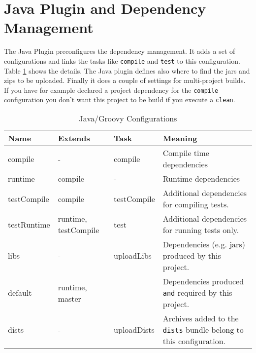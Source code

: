 \section{Java Plugin and Dependency Management} %
\label{sec:java_plugin_and_dependency_management}
The Java Plugin preconfigures the dependency management. It adds a set of configurations and links the tasks like \texttt{compile} and \texttt{test} to this configuration. Table \ref{tab:configurations} shows the details. The Java plugin defines also where to find the jars and zips to be uploaded. Finally it does a couple of settings for multi-project builds. If you have for example declared a project dependency for the \texttt{compile} configuration you don't want this project to be build if you execute a \texttt{clean}.

\begin{table}
	\begin{tabularx}{\textwidth}{|l|l|l|X|} \hline
	\textbf{Name} & \textbf{Extends} & \textbf{Task} & \textbf{Meaning} \\ \hline
	compile & - & compile & Compile time dependencies\\ \hline
	runtime & compile & - & Runtime dependencies \\ \hline
	testCompile & compile & testCompile & Additional dependencies for compiling tests. \\ \hline
	testRuntime & runtime, testCompile & test & Additional dependencies for running tests only. \\ \hline
	libs & - & uploadLibs & Dependencies (e.g. jars) produced by this project.\\ \hline
	default & runtime, master & - & Dependencies produced \texttt{and} required by this project.\\  \hline
	dists & - & uploadDists & Archives added to the \texttt{dists} bundle belong to this configuration.\\ \hline
	\end{tabularx}
	\caption{Java/Groovy Configurations}
	\label{tab:configurations}
\end{table}

